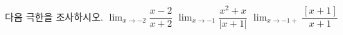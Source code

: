 다음 극한을 조사하시오. 
 $\displaystyle\lim_{x\to -2}\dfrac{x-2}{x+2}$
 $\displaystyle\lim_{x\to -1}\dfrac{x^2+x}{|x+1|}$
 $\displaystyle\lim_{x\to -1+}\dfrac{[x+1]}{x+1}$
